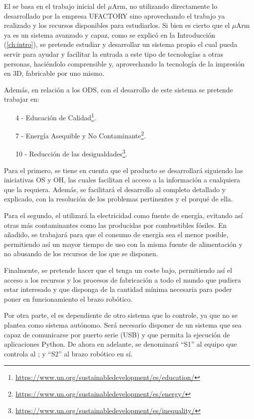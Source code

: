 El \pArm{} se basa en el trabajo inicial del $\mu$Arm, no utilizando directamente lo desarrollado por la empresa UFACTORY sino aprovechando el trabajo ya realizado y los recursos disponibles para estudiarlos. Si bien es cierto que el $\mu$Arm ya es un sistema avanzado y capaz, como se explicó en la Introducción (\ref{ch:intro}), se pretende estudiar y desarrollar un sistema propio el cual pueda servir para ayudar y facilitar la entrada a este tipo de tecnologías a otras personas, haciéndolo comprensible y, aprovechando la tecnología de la impresión en 3D, fabricable por uno mismo.

Además, en relación a los \ac{ODS}, con el desarrollo de este sistema se pretende trabajar en:

\begin{itemize}
    \item [4 -] Educación de Calidad\footnote{\url{https://www.un.org/sustainabledevelopment/es/education/}}.
    \item [7 -] Energía Asequible y No Contaminante\footnote{\url{https://www.un.org/sustainabledevelopment/es/energy/}}.
    \item [10 -] Reducción de las desigualdades\footnote{\url{https://www.un.org/sustainabledevelopment/es/inequality/}}.
\end{itemize}

Para el primero, se tiene en cuenta que el producto se desarrollará siguiendo las iniciativas \ac{OS} y \ac{OH}, las cuales facilitan el acceso a la información a cualquiera que la requiera. Además, se facilitará el desarrollo al completo detallado y explicado, con la resolución de los problemas pertinentes y el porqué de ella.

Para el segundo, el \pArm{} utilizará la electricidad como fuente de energía, evitando así otras más contaminantes como las producidas por combustibles fósiles. En añadido, se trabajará para que el consumo de energía sea el menor posible, permitiendo así un mayor tiempo de uso con la misma fuente de alimentación y no abusando de los recursos de los que se disponen.

Finalmente, se pretende hacer que el \pArm{} tenga un coste bajo, permitiendo así el acceso a los recursos y los procesos de fabricación a todo el mundo que pudiera estar interesado y que disponga de la cantidad mínima necesaria para poder poner en funcionamiento el brazo robótico.

Por otra parte, el \pArm{} es dependiente de otro sistema que lo controle, ya que no se plantea como sistema autónomo. Será necesario disponer de un sistema que sea capaz de comunicarse por puerto serie (\ac{USB}) y que permita la ejecución de aplicaciones Python. De ahora en adelante, se denominará ``\ac{S1}'' al equipo que controla al \pArm{}; y ``\ac{S2}'' al brazo robótico en sí.

